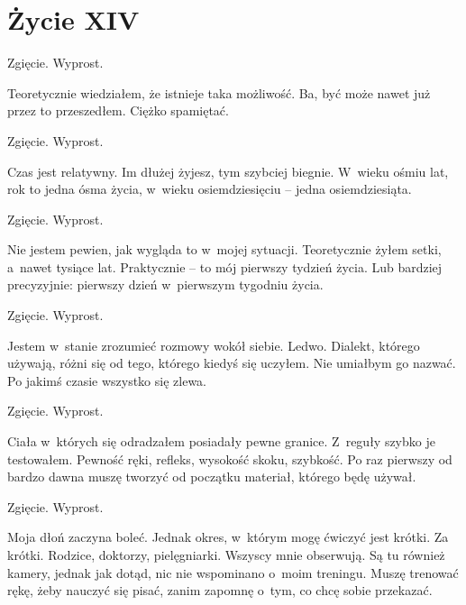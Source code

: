 \chapter{Życie XIV}

\begin{itquote}
Zgięcie. Wyprost.
\end{itquote}

Teoretycznie wiedziałem, że istnieje taka możliwość. Ba, być może nawet już przez to przeszedłem. Ciężko spamiętać.

\begin{itquote}
Zgięcie. Wyprost.
\end{itquote}

Czas jest relatywny. Im dłużej żyjesz, tym szybciej biegnie. W~wieku ośmiu lat, rok to jedna ósma życia, w~wieku 
osiemdziesięciu -- jedna osiemdziesiąta.

\begin{itquote}
Zgięcie. Wyprost.
\end{itquote}

Nie jestem pewien, jak wygląda to w~mojej sytuacji. Teoretycznie żyłem setki, a~nawet tysiące lat. Praktycznie -- to 
mój pierwszy tydzień życia. Lub bardziej precyzyjnie: pierwszy dzień w~pierwszym tygodniu życia.

\begin{itquote}
Zgięcie. Wyprost.
\end{itquote}

Jestem w~stanie zrozumieć rozmowy wokół siebie. Ledwo. Dialekt, którego używają, różni się od tego, którego kiedyś 
się uczyłem. Nie umiałbym go nazwać. Po jakimś czasie wszystko się zlewa.

\begin{itquote}
Zgięcie. Wyprost.
\end{itquote}

Ciała w~których się odradzałem posiadały pewne granice. Z~reguły szybko je testowałem. Pewność ręki, refleks, 
wysokość skoku, szybkość. Po raz pierwszy od bardzo dawna muszę tworzyć od początku materiał, którego będę używał.

\begin{itquote}
Zgięcie. Wyprost.
\end{itquote}

Moja dłoń zaczyna boleć. Jednak okres, w~którym mogę ćwiczyć jest krótki. Za krótki. Rodzice, doktorzy, pielęgniarki. 
Wszyscy mnie obserwują. Są tu również kamery, jednak jak dotąd, nic nie wspominano o~moim treningu. Muszę trenować 
rękę, żeby nauczyć się pisać, zanim zapomnę o~tym, co chcę sobie przekazać. 

